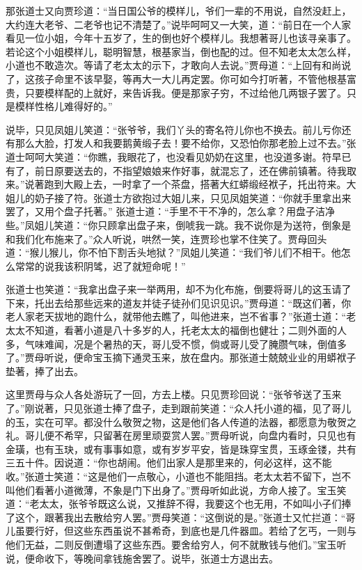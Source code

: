 \begin{parag}
    那张道士又向贾珍道：“当日国公爷的模样儿，爷们一辈的不用说，自然没赶上，大约连大老爷、二老爷也记不清楚了。”说毕呵呵又一大笑，道：“前日在一个人家看见一位小姐，今年十五岁了，生的倒也好个模样儿。我想著哥儿也该寻亲事了。若论这个小姐模样儿，聪明智慧，根基家当，倒也配的过。但不知老太太怎么样，小道也不敢造次。等请了老太太的示下，才敢向人去说。”贾母道：“上回有和尚说了，这孩子命里不该早娶，等再大一大儿再定罢。你可如今打听著，不管他根基富贵，只要模样配的上就好，来告诉我。便是那家子穷，不过给他几两银子罢了。只是模样性格儿难得好的。”
\end{parag}


\begin{parag}
    说毕，只见凤姐儿笑道：“张爷爷，我们丫头的寄名符儿你也不换去。前儿亏你还有那么大脸，打发人和我要鹅黄缎子去！要不给你，又恐怕你那老脸上过不去。”张道士呵呵大笑道：“你瞧，我眼花了，也没看见奶奶在这里，也没道多谢。符早已有了，前日原要送去的，不指望娘娘来作好事，就混忘了，还在佛前镇著。待我取来。”说著跑到大殿上去，一时拿了一个茶盘，搭著大红蟒缎经袱子，托出符来。大姐儿的奶子接了符。张道士方欲抱过大姐儿来，只见凤姐笑道：“你就手里拿出来罢了，又用个盘子托著。” 张道士道：“手里不干不净的，怎么拿？用盘子洁净些。”凤姐儿笑道：“你只顾拿出盘子来，倒唬我一跳。我不说你是为送符，倒象是和我们化布施来了。”众人听说，哄然一笑，连贾珍也掌不住笑了。贾母回头道：“猴儿猴儿，你不怕下割舌头地狱？”凤姐儿笑道：“我们爷儿们不相干。他怎么常常的说我该积阴骘，迟了就短命呢！”
\end{parag}


\begin{parag}
    张道士也笑道：“我拿出盘子来一举两用，却不为化布施，倒要将哥儿的这玉请了下来，托出去给那些远来的道友并徒子徒孙们见识见识。”贾母道：“既这们著，你老人家老天拔地的跑什么，就带他去瞧了，叫他进来，岂不省事？”张道士道：“老太太不知道，看著小道是八十多岁的人，托老太太的福倒也健壮；二则外面的人多，气味难闻，况是个暑热的天，哥儿受不惯，倘或哥儿受了腌臜气味，倒值多了。”贾母听说，便命宝玉摘下通灵玉来，放在盘内。那张道士兢兢业业的用蟒袱子垫著，捧了出去。
\end{parag}


\begin{parag}
    这里贾母与众人各处游玩了一回，方去上楼。只见贾珍回说：“张爷爷送了玉来了。”刚说著，只见张道士捧了盘子，走到跟前笑道：“众人托小道的福，见了哥儿的玉，实在可罕。都没什么敬贺之物，这是他们各人传道的法器，都愿意为敬贺之礼。哥儿便不希罕，只留著在房里顽耍赏人罢。”贾母听说，向盘内看时，只见也有金璜，也有玉玦，或有事事如意，或有岁岁平安，皆是珠穿宝贯，玉琢金镂，共有三五十件。因说道：“你也胡闹。他们出家人是那里来的，何必这样，这不能收。”张道士笑道：“这是他们一点敬心，小道也不能阻挡。老太太若不留下，岂不叫他们看著小道微薄，不象是门下出身了。”贾母听如此说，方命人接了。宝玉笑道：“老太太，张爷爷既这么说，又推辞不得，我要这个也无用，不如叫小子们捧了这个，跟著我出去散给穷人罢。”贾母笑道：“这倒说的是。”张道士又忙拦道：“哥儿虽要行好，但这些东西虽说不甚希奇，到底也是几件器皿。若给了乞丐，一则与他们无益，二则反倒遭塌了这些东西。要舍给穷人，何不就散钱与他们。”宝玉听说，便命收下，等晚间拿钱施舍罢了。说毕，张道士方退出去。
\end{parag}


